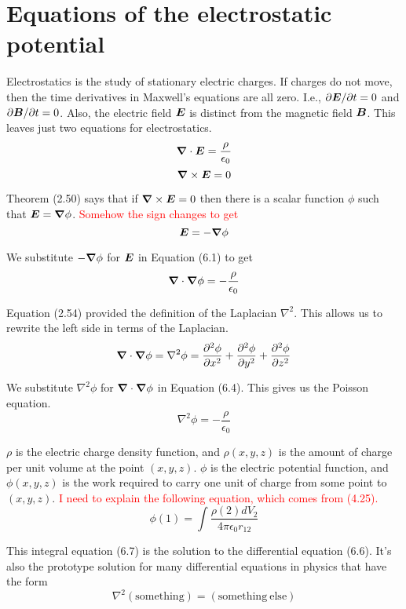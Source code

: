 \section{Equations of the electrostatic potential}

Electrostatics is the study of stationary electric charges.
If charges do not move, then the time derivatives in Maxwell's equations are all zero.
I.e., $\partial\boldsymbol{E}/\partial t=0$ and $\partial\boldsymbol{B}/\partial t=0$.
Also, the electric field $\boldsymbol{E}$ is distinct from the magnetic field $\boldsymbol{B}$.
This leaves just two equations for electrostatics.
\begin{equation}
  \boldsymbol{\nabla} \cdot \boldsymbol{E} = \frac{\rho}{\epsilon_0}
\end{equation}
\begin{equation}
  \boldsymbol{\nabla} \times \boldsymbol{E} = 0
\end{equation}

Theorem (2.50) says that if $\boldsymbol{\nabla}\times\boldsymbol{E}=0$ then
there is a scalar function $\phi$ such that $\boldsymbol{E}=\boldsymbol{\nabla}\phi$.
\textcolor{red}{Somehow the sign changes to get}
\begin{equation}
  \boldsymbol{E} = - \boldsymbol{\nabla} \phi
\end{equation}

We substitute $-\boldsymbol{\nabla}\phi$ for $\boldsymbol{E}$ in Equation (6.1) to get
\begin{equation}
  \boldsymbol{\nabla} \cdot \boldsymbol{\nabla} \phi = - \frac{\rho}{\epsilon_0}
\end{equation}

Equation (2.54) provided the definition of the Laplacian $\nabla^2$.
This allows us to rewrite the left side in terms of the Laplacian.
\begin{equation}
  \boldsymbol{\nabla} \cdot \boldsymbol{\nabla} \phi = \nabla^2 \phi
  = \frac{\partial ^2\phi}{\partial x^2} + \frac{\partial ^2\phi}{\partial y^2} + \frac{\partial ^2\phi}{\partial z^2} 
\end{equation}

We substitute $\nabla^2\phi$ for $\boldsymbol{\nabla}\cdot\boldsymbol{\nabla}\phi$ in Equation (6.4).
This gives us the Poisson equation.
\begin{equation}
  \nabla^2 \phi = - \frac{\rho}{\epsilon_0}
\end{equation}

$\rho$ is the electric charge density function, and
$\rho(x,y,z)$ is the amount of charge per unit volume at the point $(x,y,z)$.
$\phi$ is the electric potential function, and 
$\phi(x,y,z)$ is the work required to carry one unit of charge from some point to $(x,y,z)$.
\textcolor{red}{I need to explain the following equation, which comes from (4.25).}
\begin{equation}
  \phi(1) = \int \frac{\rho(2) dV_2}{4\pi\epsilon_0 r_{12}}
\end{equation}

This integral equation (6.7) is the solution to the differential equation (6.6).
It's also the prototype solution for many differential equations in physics
that have the form
\begin{equation*}
  \nabla^2 (\mathrm{something}) = (\mathrm{something\ else})
\end{equation*}

